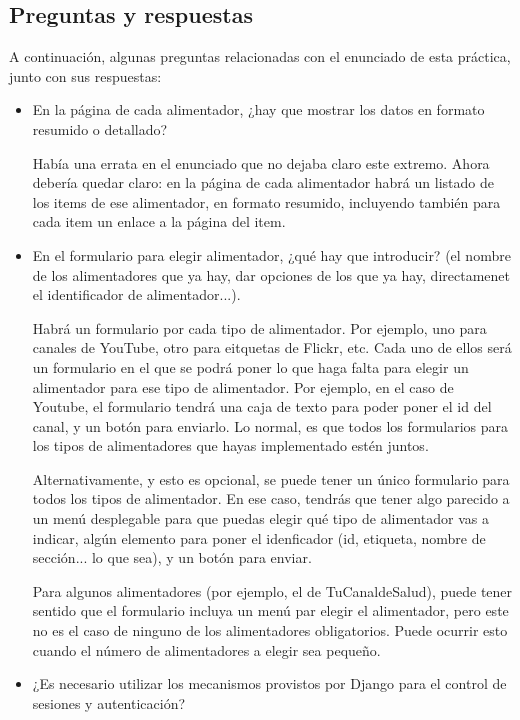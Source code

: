 \subsection{Preguntas y respuestas}

A continuación, algunas preguntas relacionadas con el enunciado de esta práctica, junto con sus respuestas:

\begin{itemize}

\item En la página de cada alimentador, ¿hay que mostrar los datos en formato resumido o detallado?

  Había una errata en el enunciado que no dejaba claro este extremo. Ahora debería quedar claro: en la página de cada alimentador habrá un listado de los items de ese alimentador, en formato resumido, incluyendo también para cada item un enlace a la página del item.
  
\item En el formulario para elegir alimentador, ¿qué hay que introducir? (el nombre de los alimentadores que ya hay, dar opciones de los que ya hay, directamenet el identificador de alimentador...).

  Habrá un formulario por cada tipo de alimentador. Por ejemplo, uno para canales de YouTube, otro para eitquetas de Flickr, etc. Cada uno de ellos será un formulario en el que se podrá poner lo que haga falta para elegir un alimentador para ese tipo de alimentador. Por ejemplo, en el caso de Youtube, el formulario tendrá una caja de texto para poder poner el id del canal, y un botón para enviarlo. Lo normal, es que todos los formularios para los tipos de alimentadores que hayas implementado estén juntos.

  Alternativamente, y esto es opcional, se puede tener un único formulario para todos los tipos de alimentador. En ese caso, tendrás que tener algo parecido a un menú desplegable para que puedas elegir qué tipo de alimentador vas a indicar, algún elemento para poner el idenficador (id, etiqueta, nombre de sección... lo que sea), y un botón para enviar.

  Para algunos alimentadores (por ejemplo, el de TuCanaldeSalud), puede tener sentido que el formulario incluya un menú par elegir el alimentador, pero este no es el caso de ninguno de los alimentadores obligatorios. Puede ocurrir esto cuando el número de alimentadores a elegir sea pequeño.
  
\item ¿Es necesario utilizar los mecanismos provistos por Django para el control de sesiones y autenticación?


\end{itemize}
